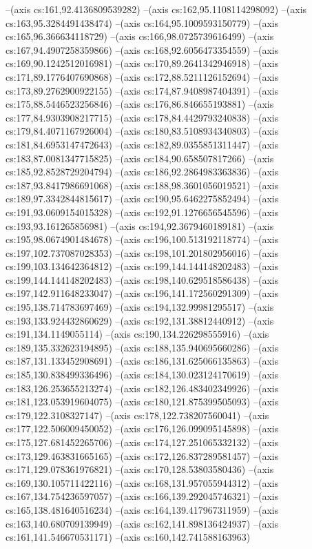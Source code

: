 --(axis cs:161,92.4136809539282)
--(axis cs:162,95.1108114298092)
--(axis cs:163,95.3284491438474)
--(axis cs:164,95.1009593150779)
--(axis cs:165,96.366634118729)
--(axis cs:166,98.0725739616499)
--(axis cs:167,94.4907258359866)
--(axis cs:168,92.6056473354559)
--(axis cs:169,90.1242512016981)
--(axis cs:170,89.2641342946918)
--(axis cs:171,89.1776407690868)
--(axis cs:172,88.5211126152694)
--(axis cs:173,89.2762900922155)
--(axis cs:174,87.9408987404391)
--(axis cs:175,88.5446523256846)
--(axis cs:176,86.846655193881)
--(axis cs:177,84.9303908217715)
--(axis cs:178,84.4429793240838)
--(axis cs:179,84.4071167926004)
--(axis cs:180,83.5108934340803)
--(axis cs:181,84.6953147472643)
--(axis cs:182,89.0355851311447)
--(axis cs:183,87.0081347715825)
--(axis cs:184,90.658507817266)
--(axis cs:185,92.8528729204794)
--(axis cs:186,92.2864983363836)
--(axis cs:187,93.8417986691068)
--(axis cs:188,98.3601056019521)
--(axis cs:189,97.3342844815617)
--(axis cs:190,95.6462275852494)
--(axis cs:191,93.0609154015328)
--(axis cs:192,91.1276656545596)
--(axis cs:193,93.161265856981)
--(axis cs:194,92.3679460189181)
--(axis cs:195,98.0674901484678)
--(axis cs:196,100.513192118774)
--(axis cs:197,102.737087028353)
--(axis cs:198,101.201802956016)
--(axis cs:199,103.134642364812)
--(axis cs:199,144.144148202483)
--(axis cs:199,144.144148202483)
--(axis cs:198,140.629518586438)
--(axis cs:197,142.911648233047)
--(axis cs:196,141.172560291309)
--(axis cs:195,138.714783697469)
--(axis cs:194,132.99981295517)
--(axis cs:193,133.924432860629)
--(axis cs:192,131.38812440912)
--(axis cs:191,134.1149055114)
--(axis cs:190,134.226298555916)
--(axis cs:189,135.332623194895)
--(axis cs:188,135.940695660286)
--(axis cs:187,131.133452908691)
--(axis cs:186,131.625066135863)
--(axis cs:185,130.838499336496)
--(axis cs:184,130.023124170619)
--(axis cs:183,126.253655213274)
--(axis cs:182,126.483402349926)
--(axis cs:181,123.053919604075)
--(axis cs:180,121.875399505093)
--(axis cs:179,122.3108327147)
--(axis cs:178,122.738207560041)
--(axis cs:177,122.506009450052)
--(axis cs:176,126.099095145898)
--(axis cs:175,127.681452265706)
--(axis cs:174,127.251065332132)
--(axis cs:173,129.463831665165)
--(axis cs:172,126.837289581457)
--(axis cs:171,129.078361976821)
--(axis cs:170,128.53803580436)
--(axis cs:169,130.105711422116)
--(axis cs:168,131.957055944312)
--(axis cs:167,134.754236597057)
--(axis cs:166,139.292045746321)
--(axis cs:165,138.481640516234)
--(axis cs:164,139.417967311959)
--(axis cs:163,140.680709139949)
--(axis cs:162,141.898136424937)
--(axis cs:161,141.546670531171)
--(axis cs:160,142.741588163963)
